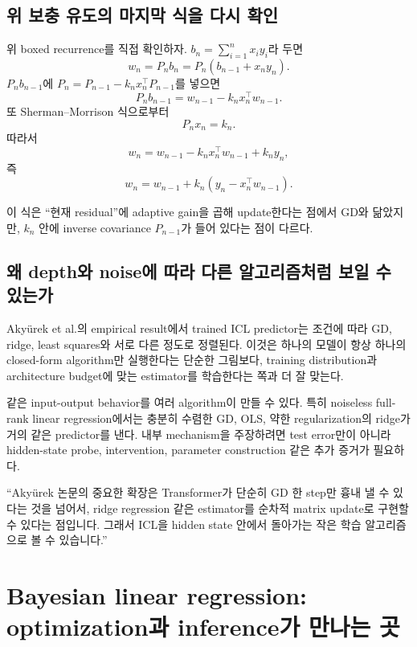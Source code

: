 \documentclass[11pt,a4paper,oneside,openany]{memoir}
\theoremstyle{definition}
\begin{document}
\section{위 보충 유도의 마지막 식을 다시 확인}

위 boxed recurrence를 직접 확인하자. $b_n=\sum_{i=1}^n x_iy_i$라 두면
\[
w_n=P_nb_n=P_n(b_{n-1}+x_ny_n).
\]
$P_nb_{n-1}$에 $P_n=P_{n-1}-k_nx_n^\top P_{n-1}$를 넣으면
\[
P_nb_{n-1}
=w_{n-1}-k_nx_n^\top w_{n-1}.
\]
또 Sherman--Morrison 식으로부터
\[
P_nx_n=k_n.
\]
따라서
\[
w_n
=w_{n-1}-k_nx_n^\top w_{n-1}+k_ny_n,
\]
즉
\[
\boxed{
w_n=w_{n-1}+k_n(y_n-x_n^\top w_{n-1})}.
\]

이 식은 ``현재 residual''에 adaptive gain을 곱해 update한다는 점에서 GD와 닮았지만,
$k_n$ 안에 inverse covariance $P_{n-1}$가 들어 있다는 점이 다르다.

\section{왜 depth와 noise에 따라 다른 알고리즘처럼 보일 수 있는가}

Akyürek et al.의 empirical result에서 trained ICL predictor는 조건에 따라 GD, ridge, least squares와 서로 다른 정도로 정렬된다.
이것은 하나의 모델이 항상 하나의 closed-form algorithm만 실행한다는 단순한 그림보다,
training distribution과 architecture budget에 맞는 estimator를 학습한다는 쪽과 더 잘 맞는다.

\begin{keybox}
같은 input-output behavior를 여러 algorithm이 만들 수 있다. 특히 noiseless full-rank linear regression에서는 충분히 수렴한 GD, OLS, 약한 regularization의 ridge가 거의 같은 predictor를 낸다. 내부 mechanism을 주장하려면 test error만이 아니라 hidden-state probe, intervention, parameter construction 같은 추가 증거가 필요하다.
\end{keybox}

\begin{presentbox}
``Akyürek 논문의 중요한 확장은 Transformer가 단순히 GD 한 step만 흉내 낼 수 있다는 것을 넘어서, ridge regression 같은 estimator를 순차적 matrix update로 구현할 수 있다는 점입니다. 그래서 ICL을 hidden state 안에서 돌아가는 작은 학습 알고리즘으로 볼 수 있습니다.''
\end{presentbox}

\chapter{Bayesian linear regression: optimization과 inference가 만나는 곳}
\end{document}
